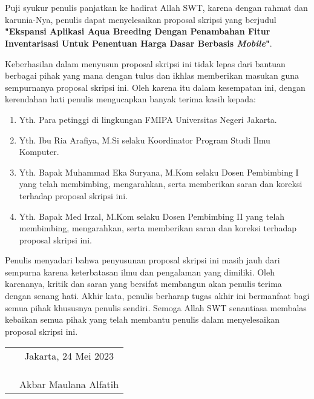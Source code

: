 \chapter*{}

Puji syukur penulis panjatkan ke hadirat Allah SWT, karena dengan rahmat dan karunia-Nya, penulis dapat menyelesaikan proposal skripsi yang berjudul \textbf{"Ekspansi Aplikasi Aqua Breeding Dengan Penambahan Fitur Inventarisasi Untuk Penentuan Harga Dasar Berbasis \textit{Mobile}"}.

Keberhasilan dalam menyusun proposal skripsi ini tidak lepas dari bantuan berbagai pihak yang mana dengan tulus dan ikhlas memberikan masukan guna sempurnanya proposal skripsi ini. Oleh karena itu dalam kesempatan ini, dengan kerendahan hati penulis mengucapkan banyak terima kasih kepada:

\begin{enumerate}

	\item{Yth. Para petinggi di lingkungan FMIPA Universitas Negeri Jakarta.}
	\item{Yth. Ibu Ria Arafiya, M.Si selaku Koordinator Program Studi Ilmu Komputer.}
	\item{Yth. Bapak Muhammad Eka Suryana, M.Kom selaku Dosen Pembimbing I yang telah membimbing, mengarahkan, serta memberikan saran dan koreksi terhadap proposal skripsi ini.}
	\item{Yth. Bapak Med Irzal, M.Kom selaku Dosen Pembimbing II yang telah membimbing, mengarahkan, serta memberikan saran dan koreksi terhadap proposal skripsi ini.}
	
\end{enumerate}

Penulis menyadari bahwa penyusunan proposal skripsi ini masih jauh dari sempurna karena keterbatasan ilmu dan pengalaman yang dimiliki. Oleh karenanya, kritik dan saran yang bersifat membangun akan penulis terima dengan senang hati. Akhir kata, penulis berharap tugas akhir ini bermanfaat bagi semua pihak khususnya penulis sendiri. Semoga Allah SWT senantiasa membalas kebaikan semua pihak yang telah membantu penulis dalam menyelesaikan proposal skripsi ini.

\vspace{2cm}

\begin{tabular}{p{8.5cm}c}
	&Jakarta, 24 Mei 2023\\
	&\\
	&\\
	&\\
	&Akbar Maulana Alfatih
\end{tabular}